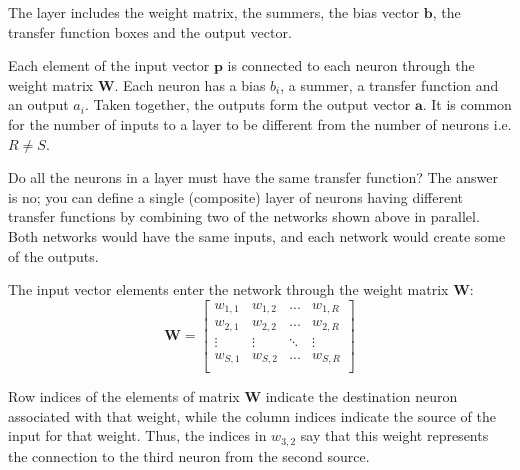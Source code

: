 \documentclass[12pt, a4paper, twoside]{report}
\begin{document}
The layer includes the weight matrix, the summers, the bias vector $\mathbf{b}$, the transfer function boxes and the output vector.
\par
Each element of the input vector $\mathbf{p}$ is connected to each neuron through the weight matrix $\mathbf{W}$. Each neuron has a bias $b_i$, a summer, a transfer function and an output $a_i$. Taken together, the outputs form the output vector $\mathbf{a}$. It is common for the number of inputs to a layer to be different from the number of neurons i.e. $R \neq S$.
\par
Do all the neurons in a layer must have the same transfer function? The answer is no; you can define a single (composite) layer of neurons having different transfer functions by combining two of the networks shown above in parallel. Both networks would have the same inputs, and each network would create some of the outputs.
\par
The input vector elements enter the network through the weight matrix $\mathbf{W}$:
\begin{equation*}
\mathbf{W} = \begin{bmatrix}
w_{1,1} & w_{1,2} & ... & w_{1,R} \\ 
w_{2,1} & w_{2,2} & ... & w_{2,R} \\ 
 \vdots & \vdots & \ddots & \vdots \\ 
w_{S,1} & w_{S,2} & ... & w_{S,R}\\ 
\end{bmatrix}
\end{equation*}

Row indices of the elements of matrix $\mathbf{W}$ indicate the destination neuron associated with that weight, while the column indices indicate the source of the input for that weight. Thus, the indices in $w_{3,2}$ say that this weight represents the connection to the third neuron from the second source.
\end{document}
